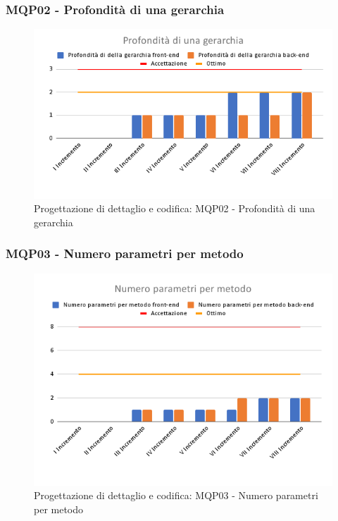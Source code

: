 \subsubsection{MQP02 - Profondità di una gerarchia}
\begin{figure}[H]
    \centering
    \includegraphics[scale=0.50]{Sezioni/images/pb_prodotto/Profondita_di_una_gerarchia.png}
    \caption{Progettazione di dettaglio e codifica: MQP02 - Profondità di una gerarchia}
\end{figure}
\subsubsection{MQP03 - Numero parametri per metodo}
\begin{figure}[H]
    \centering
    \includegraphics[scale=0.50]{Sezioni/images/pb_prodotto/Numero_parametri_per_metodo.png}
    \caption{Progettazione di dettaglio e codifica: MQP03 - Numero parametri per metodo}
\end{figure}

